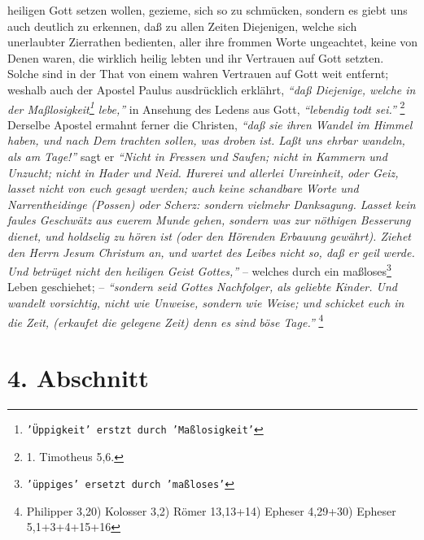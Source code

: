 heiligen Gott setzen wollen, gezieme, sich so zu schmücken, sondern es giebt uns
auch deutlich zu erkennen, daß zu allen Zeiten Diejenigen, welche sich
unerlaubter Zierrathen bedienten, aller ihre frommen Worte ungeachtet, keine von
Denen waren, die wirklich heilig lebten und ihr Vertrauen auf Gott setzten.
Solche sind in der That von einem wahren Vertrauen auf Gott weit entfernt;
weshalb auch der Apostel Paulus ausdrücklich erklährt,
\textit{"`daß Diejenige, welche
in der Maßlosigkeit\footnote{\texttt{'Üppigkeit' erstzt durch 'Maßlosigkeit'}} lebe,"'} in Ansehung des Ledens aus Gott,
\textit{"`lebendig todt sei."'}
\footnote{1. Timotheus 5,6.}
Derselbe Apostel ermahnt ferner die Christen,
\textit{"`daß sie ihren Wandel im Himmel haben, und nach Dem trachten sollen, was droben
ist. Laßt uns ehrbar wandeln, als am Tage!"'} sagt er
\textit{"`Nicht in Fressen und
Saufen; nicht in Kammern und Unzucht; nicht in Hader und Neid. Hurerei und
allerlei Unreinheit, oder Geiz, lasset nicht von euch gesagt werden; auch keine
schandbare Worte und Narrentheidinge (Possen) oder Scherz: sondern vielmehr
Danksagung. Lasset kein faules Geschwätz aus euerem Munde gehen, sondern was zur
nöthigen Besserung dienet, und holdselig zu hören ist (oder den Hörenden
Erbauung gewährt). Ziehet den Herrn Jesum Christum an, und wartet des Leibes
nicht so, daß er geil werde. Und betrüget nicht den heiligen Geist Gottes,"'} --
welches durch ein maßloses\footnote{\texttt{'üppiges' ersetzt durch 'maßloses'}} Leben geschiehet; --
\textit{"`sondern seid Gottes Nachfolger,
als geliebte Kinder. Und wandelt vorsichtig, nicht wie Unweise, sondern wie
Weise; und schicket euch in die Zeit, (erkaufet die gelegene Zeit) denn es sind
böse Tage."'}
\footnote{Philipper 3,20)  Kolosser 3,2)  Römer 13,13+14) Epheser 4,29+30) Epheser 5,1+3+4+15+16}

\section{4. Abschnitt} \label{kap15_ab4}

